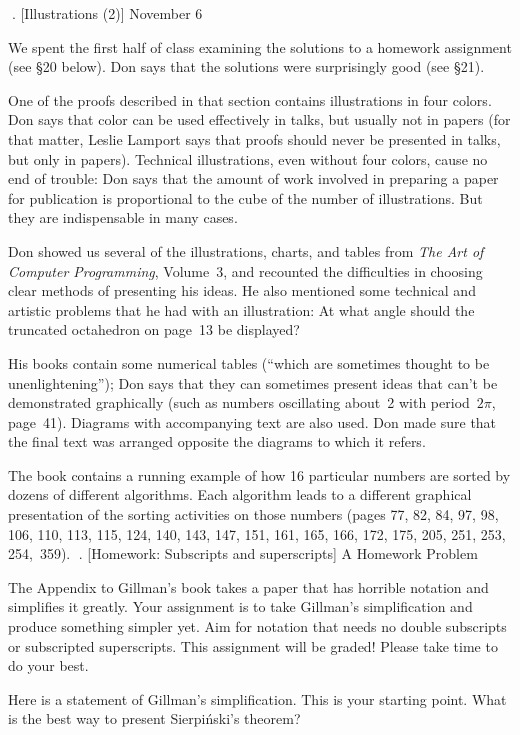 . [Illustrations (2)] \tll November 6

We spent the first half of class examining the solutions to a homework
assignment (see \S{20} below).
Don says that the solutions were surprisingly good
(see \S{21}).

One of the proofs described in that section
 contains illustrations in four colors.  Don says
that color can be used effectively in talks, but usually not in papers
(for that matter, Leslie Lamport says that proofs should never be
presented in talks, but only in papers). Technical illustrations, even
without four colors, cause no end of trouble: Don says that the amount of
work involved in preparing a paper for publication is proportional to the
cube of the number of illustrations.  But they are indispensable in many
cases.

Don showed us several of the illustrations, charts, and tables from {\sl The
Art of Computer Programming}, Volume~3,
and recounted the difficulties in choosing
clear methods of presenting his ideas.  He also mentioned some technical
and artistic problems that he had with an illustration: At what angle
should the truncated octahedron on page~13 be displayed?

His books contain some numerical tables (``which are sometimes thought to
be unenlightening''); Don says that they can sometimes
present ideas that can't be
demonstrated graphically (such as numbers oscillating about~2 with period~$2\pi$,
page~41).  Diagrams with accompanying text are also used. Don made sure that
the final text was arranged opposite the diagrams to which it refers.

The book contains a running example of how 16 particular numbers are sorted
by dozens of different algorithms. Each algorithm leads to a different
graphical presentation of the sorting activities on those numbers
(pages 77, 82, 84,
97, 98, 106, 110, 113, 115, 124, 140, 143, 147, 151, 161, 165, 166, 172,
175, 205, 251, 253, 254,~359).
. [Homework: Subscripts and superscripts] A Homework Problem

The Appendix to Gillman's book takes a paper that has horrible notation
and simplifies it greatly. Your assignment is to take Gillman's simplification
and produce something simpler yet. Aim for notation that needs no double
subscripts or subscripted superscripts.
This assignment will be graded! Please take time to do your best.

Here is a statement of Gillman's simplification. This is your starting
point. What is the best way to present Sierpi\'nski's theorem?

